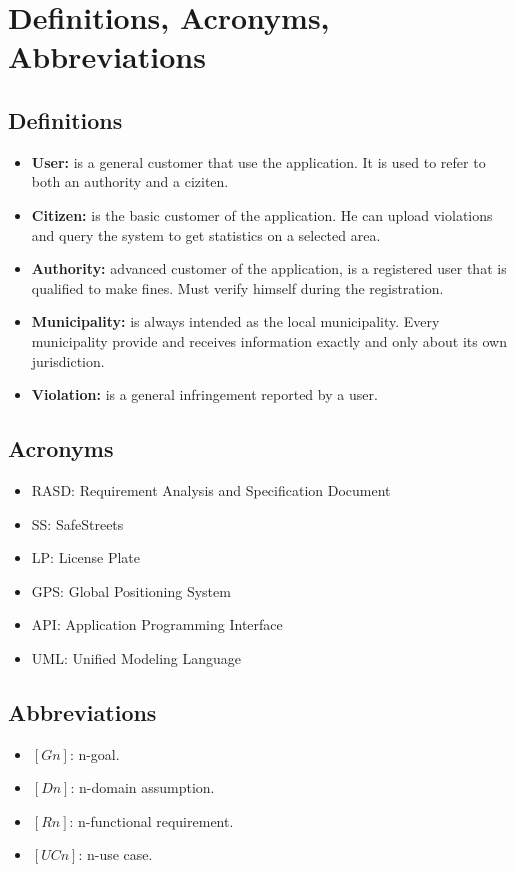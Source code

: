 \documentclass[a4paper, hidelinks, 12pt]{report}
\begin{document}
	\section{Definitions, Acronyms, Abbreviations}\label{sec:definitions,-acronyms,-abbreviations}
        \subsection{Definitions}\label{subsec:definitions}
            \begin{itemize}
                \item \textbf{User:} is a general customer that use the application. It is used to refer to both an authority and a ciziten.
                \item \textbf{Citizen:} is the basic customer of the application. He can upload violations and query the system to get statistics on a selected area.
                \item \textbf{Authority:} advanced customer of the application, is a registered user that is qualified to make fines. Must verify himself during the registration.
                \item \textbf{Municipality:} is always intended as the local municipality. Every municipality provide and receives information exactly and only about its own jurisdiction.
                \item \textbf{Violation:} is a general infringement reported by a user.
            \end{itemize}

        \subsection{Acronyms}\label{subsec:acronyms}
            \begin{itemize}
                \item RASD: Requirement Analysis and Specification Document
                \item SS: SafeStreets
                \item LP: License Plate
                \item GPS: Global Positioning System
                \item API: Application Programming Interface
                \item UML: Unified Modeling Language
            \end{itemize}

        \subsection{Abbreviations}\label{subsec:abbreviations}
            \begin{itemize}
                \item $[Gn]$: n-goal.
                \item $[Dn]$: n-domain assumption.
                \item $[Rn]$: n-functional requirement.
                \item $[UCn]$: n-use case.
            \end{itemize}
\end{document}

